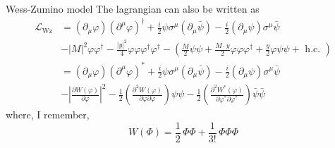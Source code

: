 \documentclass[10pt]{beamer}
\begin{document}
\begin{frame}{Wess-Zumino model}
    The lagrangian can also be written as
    \begin{equation*}
        \begin{aligned}
            \mathcal{L}_{\mathrm{Wz}} &=\left(\partial_{\mu} \varphi\right)\left(\partial^{\mu} \varphi\right)^{\dagger}+\frac{i}{2} \psi \sigma^{\mu}\left(\partial_{\mu} \bar{\psi}\right)-\frac{i}{2}\left(\partial_{\mu} \psi\right) \sigma^{\mu} \bar{\psi} \\
            &-|M|^{2} \varphi \varphi^{\dagger}-\frac{|y|^{2}}{4} \varphi \varphi \varphi^{\dagger} \varphi^{\dagger}-\left(\frac{M}{2} \psi \psi+\frac{M \cdot y}{2} \varphi \varphi \varphi^{\dagger}+\frac{y}{2} \varphi \psi \psi+\text { h.c. }\right) \\
            &=\left(\partial_{\mu} \varphi\right)\left(\partial^{\mu} \varphi\right)^{*}+\frac{i}{2} \psi \sigma^{\mu}\left(\partial_{\mu} \bar{\psi}\right)-\frac{i}{2}\left(\partial_{\mu} \psi\right) \sigma^{\mu} \bar{\psi} \\
            &-\left|\frac{\partial W\left(\varphi\right)}{\partial \varphi}\right|^{2}-\frac{1}{2}\left(\frac{\partial^{2} W\left(\varphi\right)}{\partial \varphi \partial \varphi}\right) \psi \psi-\frac{1}{2}\left(\frac{\partial^{2} W^{*}\left(\varphi\right)}{\partial \varphi^{*} \partial \varphi^{*}}\right) \bar{\psi} \bar{\psi}
        \end{aligned}
    \end{equation*}
    where, I remember,
    \begin{equation*}
        W(\Phi) = \frac{1}{2} \, \Phi\Phi + \frac{1}{3!} \, \Phi\Phi\Phi
    \end{equation*}
\end{frame}
\end{document}
